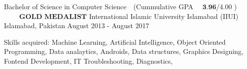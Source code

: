 

\begin{cventries}
	\cventry
	{Bachelor of Science in Computer Science$\quad$(Cummulative GPA $\quad\textbf{3.96}$/4.00 ) $~~~~\quad$ $\textbf{GOLD MEDALIST}$} %
	{International Islamic University Islamabad (IIUI)} %
	{Islamabad, Pakistan} %
	{August 2013 - August 2017} %
	{
		\begin{cvitems} %
			\item {Skills acquired: Machine Learning, Artificial Intelligence, Object Oriented Programming, Data analaytics, Androids, Data structures,  Graphics Designing, Fontend Development, IT Troubleshooting, Diagnostics, }
		\end{cvitems}
	}
\end{cventries}
